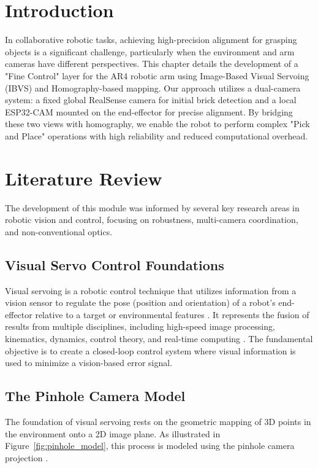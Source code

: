 \documentclass{article}
\begin{document}
\section{Introduction}
In collaborative robotic tasks, achieving high-precision alignment for grasping objects is a significant challenge, particularly when the environment and arm cameras have different perspectives. This chapter details the development of a "Fine Control" layer for the AR4 robotic arm using Image-Based Visual Servoing (IBVS) and Homography-based mapping. Our approach utilizes a dual-camera system: a fixed global RealSense camera for initial brick detection and a local ESP32-CAM mounted on the end-effector for precise alignment. By bridging these two views with homography, we enable the robot to perform complex "Pick and Place" operations with high reliability and reduced computational overhead.

\section{Literature Review}
The development of this module was informed by several key research areas in robotic vision and control, focusing on robustness, multi-camera coordination, and non-conventional optics.

\subsection{Visual Servo Control Foundations}
Visual servoing is a robotic control technique that utilizes information from a vision sensor to regulate the pose (position and orientation) of a robot's end-effector relative to a target or environmental features \cite{Hutchinson1996}. It represents the fusion of results from multiple disciplines, including high-speed image processing, kinematics, dynamics, control theory, and real-time computing \cite{Hutchinson1996}. The fundamental objective is to create a closed-loop control system where visual information is used to minimize a vision-based error signal.

\subsection{The Pinhole Camera Model}
The foundation of visual servoing rests on the geometric mapping of 3D points in the environment onto a 2D image plane. As illustrated in Figure~\ref{fig:pinhole_model}, this process is modeled using the pinhole camera projection \cite{Hutchinson1996}.
\end{document}
